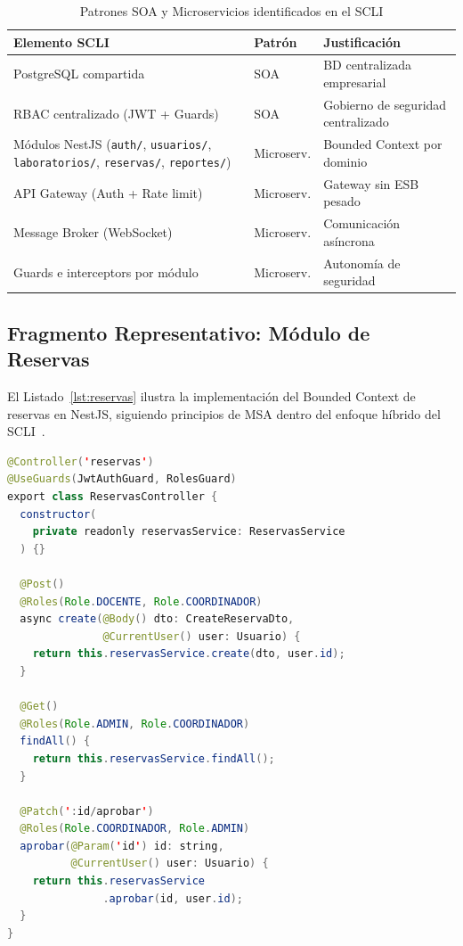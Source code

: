 \documentclass[conference,a4paper]{IEEEtran}
\begin{document}
\begin{table}[H]
\centering
\caption{Patrones SOA y Microservicios identificados en el SCLI}
\label{tab:scli-patrones}
\renewcommand{\arraystretch}{1.25}
\begin{tabularx}{\columnwidth}{>{\footnotesize}X
                               >{\footnotesize\centering}p{1.25cm}
                               >{\footnotesize}X}
\toprule
\textbf{Elemento SCLI} & \textbf{Patr\'on} & \textbf{Justificaci\'on} \\
\midrule
PostgreSQL compartida  & SOA        & BD centralizada empresarial \\
RBAC centralizado (JWT + Guards) & SOA & Gobierno de seguridad centralizado \\
M\'odulos NestJS (\texttt{auth/}, \texttt{usuarios/}, \texttt{laboratorios/}, \texttt{reservas/}, \texttt{reportes/}) & Microserv. & Bounded Context por dominio \\
API Gateway (Auth + Rate limit) & Microserv. & Gateway sin ESB pesado \\
Message Broker (WebSocket) & Microserv. & Comunicaci\'on as\'incrona \\
Guards e interceptors por m\'odulo & Microserv. & Autonom\'ia de seguridad \\
\bottomrule
\end{tabularx}
\end{table}

\subsection{Fragmento Representativo: M\'odulo de Reservas}

El Listado~\ref{lst:reservas} ilustra la implementaci\'on del
Bounded Context de reservas en NestJS, siguiendo principios
de MSA dentro del enfoque h\'ibrido del SCLI~\cite{waseem2021}.

\begin{lstlisting}[language=Java,
  caption={Controlador de Reservas con RBAC -- SCLI},
  label={lst:reservas}]
@Controller('reservas')
@UseGuards(JwtAuthGuard, RolesGuard)
export class ReservasController {
  constructor(
    private readonly reservasService: ReservasService
  ) {}

  @Post()
  @Roles(Role.DOCENTE, Role.COORDINADOR)
  async create(@Body() dto: CreateReservaDto,
               @CurrentUser() user: Usuario) {
    return this.reservasService.create(dto, user.id);
  }

  @Get()
  @Roles(Role.ADMIN, Role.COORDINADOR)
  findAll() {
    return this.reservasService.findAll();
  }

  @Patch(':id/aprobar')
  @Roles(Role.COORDINADOR, Role.ADMIN)
  aprobar(@Param('id') id: string,
          @CurrentUser() user: Usuario) {
    return this.reservasService
               .aprobar(id, user.id);
  }
}
\end{lstlisting}
\end{document}
